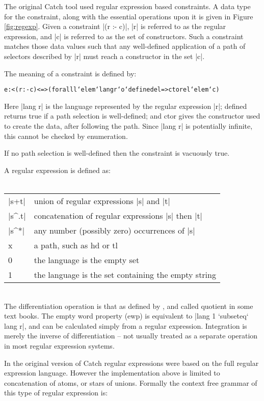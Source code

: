 \documentclass[preprint]{sigplanconf}
\newcommand{\C}[1]{\textsf{#1}}
\newenvironment{code}{\begin{alltt}\small}{\end{alltt}}
\begin{document}
The original Catch tool used regular expression based constraints. A data type for the constraint, along with the essential operations upon it is given in Figure \ref{fig:regexp}. Given a constraint |(r :- c)|, |r| is referred to as the regular expression, and |c| is referred to as the set of constructors. Such a constraint matches those data values such that any well-defined application of a path of selectors described by |r| must reach a constructor in the set |c|.

The meaning of a constraint is defined by:

\begin{code}
e :< (r :- c) <=> (forall l `elem` lang r `o` defined e l => ctor e l `elem` c)
\end{code}

Here |lang r| is the language represented by the regular expression |r|; \C{defined} returns true if a path selection is well-defined; and \C{ctor} gives the constructor used to create the data, after following the path. Since |lang r| is potentially infinite, this cannot be checked by enumeration.

If no path selection is well-defined then the constraint is vacuously true.

A regular expression is defined as:\\ \\
\begin{tabular}{ll}
|s+t| & union of regular expressions |s| and |t| \\
|s^.t| & concatenation of regular expressions |s| then |t| \\
|s^*|  & any number (possibly zero) occurrences of |s| \\
\C{x} & a path, such as \C{hd} or \C{tl} \\
0 & the language is the empty set \\
1 & the language is the set containing the empty string
\end{tabular} \\

The differentiation operation is that as defined by \citet{conway}, and called quotient in some text books. The empty word property (\C{ewp}) is equivalent to |lang 1 `subseteq` lang r|, and can be calculated simply from a regular expression. Integration is merely the inverse of differentiation -- not usually treated as a separate operation in most regular expression systems.

In the original version of Catch regular expressions were based on the full regular expression language. However the implementation above is limited to concatenation of atoms, or stars of unions. Formally the context free grammar of this type of regular expression is:
\end{document}
